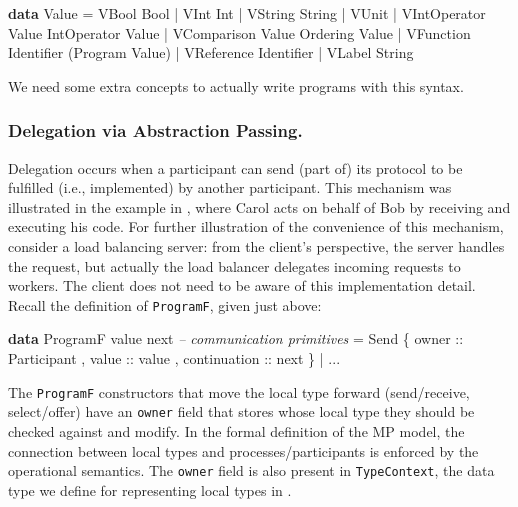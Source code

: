 \documentclass[runningheads,plain]{llncs}
\newenvironment{Shaded}{}{}
\newcommand{\KeywordTok}[1]{\textcolor[rgb]{0.00,0.44,0.13}{\textbf{#1}}}
\newcommand{\DataTypeTok}[1]{\textcolor[rgb]{0.56,0.13,0.00}{#1}}
\newcommand{\CommentTok}[1]{\textcolor[rgb]{0.38,0.63,0.69}{\textit{#1}}}
\newcommand{\OtherTok}[1]{\textcolor[rgb]{0.00,0.44,0.13}{#1}}
\newcommand{\FunctionTok}[1]{\textcolor[rgb]{0.02,0.16,0.49}{#1}}
\newcommand{\NormalTok}[1]{#1}
\begin{document}
\begin{Shaded}
\begin{Highlighting}[]
\KeywordTok{data} \DataTypeTok{Value} 
    \FunctionTok{=} \DataTypeTok{VBool} \DataTypeTok{Bool}
    \FunctionTok{|} \DataTypeTok{VInt} \DataTypeTok{Int}
    \FunctionTok{|} \DataTypeTok{VString} \DataTypeTok{String}
    \FunctionTok{|} \DataTypeTok{VUnit}
    \FunctionTok{|} \DataTypeTok{VIntOperator} \DataTypeTok{Value} \DataTypeTok{IntOperator} \DataTypeTok{Value} 
    \FunctionTok{|} \DataTypeTok{VComparison} \DataTypeTok{Value} \DataTypeTok{Ordering} \DataTypeTok{Value}
    \FunctionTok{|} \DataTypeTok{VFunction} \DataTypeTok{Identifier}\NormalTok{ (}\DataTypeTok{Program} \DataTypeTok{Value}\NormalTok{)}
    \FunctionTok{|} \DataTypeTok{VReference} \DataTypeTok{Identifier} 
    \FunctionTok{|} \DataTypeTok{VLabel} \DataTypeTok{String}
\end{Highlighting}
\end{Shaded}

We need some extra concepts to actually write programs with this syntax.

\subsubsection{Delegation via Abstraction Passing.}\label{abstraction-passing}
Delegation occurs when a participant can send (part of)
its protocol to be fulfilled (i.e., implemented) by another participant. 
This mechanism was illustrated 
in the example in , where Carol acts on behalf of Bob by receiving and executing his code.
For further illustration of the convenience of this mechanism, 
consider a  load balancing server: from the client's
perspective, the server handles the request, but actually the load
balancer delegates incoming requests to workers. The client does not
need to be aware of this implementation detail.
Recall the definition of \texttt{ProgramF}, given just above:
\begin{Shaded}
\begin{Highlighting}[]
\KeywordTok{data} \DataTypeTok{ProgramF}\NormalTok{ value next }
    \CommentTok{-- communication primitives}
    \FunctionTok{=} \DataTypeTok{Send} 
\NormalTok{        \{}\OtherTok{ owner ::} \DataTypeTok{Participant}
\NormalTok{        ,}\OtherTok{ value ::}\NormalTok{ value}
\NormalTok{        ,}\OtherTok{ continuation ::}\NormalTok{ next }
\NormalTok{        \}}
    \FunctionTok{|} \FunctionTok{...} 
\end{Highlighting}
\end{Shaded}
The \texttt{ProgramF} constructors that move the local type forward
(send/receive, select/offer) have an \texttt{owner} field that stores
whose local type they should be checked against and modify. 
In the formal definition of the MP model, the connection between local types and processes/participants is enforced by the operational semantics.
The \texttt{owner} field is
also present in \texttt{TypeContext}, the data type we define for representing local types in . 
\end{document}
